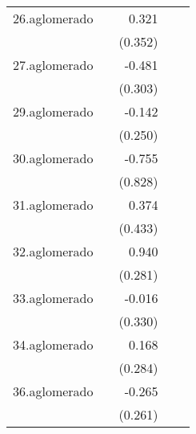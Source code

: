 {\begin{longtable}{l*{4}{D{.}{.}{-1}}}
\addlinespace
26.aglomerado&                     &       0.321         &                     &                     \\
            &                     &     (0.352)         &                     &                     \\
\addlinespace
27.aglomerado&                     &      -0.481         &                     &                     \\
            &                     &     (0.303)         &                     &                     \\
\addlinespace
29.aglomerado&                     &      -0.142         &                     &                     \\
            &                     &     (0.250)         &                     &                     \\
\addlinespace
30.aglomerado&                     &      -0.755         &                     &                     \\
            &                     &     (0.828)         &                     &                     \\
\addlinespace
31.aglomerado&                     &       0.374         &                     &                     \\
            &                     &     (0.433)         &                     &                     \\
\addlinespace
32.aglomerado&                     &       0.940\sym{***}&                     &                     \\
            &                     &     (0.281)         &                     &                     \\
\addlinespace
33.aglomerado&                     &      -0.016         &                     &                     \\
            &                     &     (0.330)         &                     &                     \\
\addlinespace
34.aglomerado&                     &       0.168         &                     &                     \\
            &                     &     (0.284)         &                     &                     \\
\addlinespace
36.aglomerado&                     &      -0.265         &                     &                     \\
            &                     &     (0.261)         &                     &                     \\

\end{longtable}}
